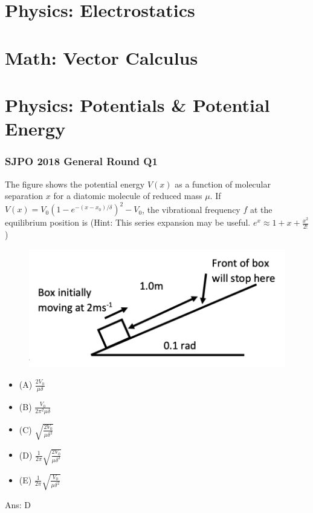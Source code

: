\documentclass{article}
\begin{document}
\section{Physics: Electrostatics}

\section{Math: Vector Calculus}
\clearpage
\section{Physics: Potentials \& Potential Energy}
\subsubsection{SJPO 2018 General Round Q1}
The figure shows the potential energy $V(x)$ as a function of molecular separation $x$ for a diatomic molecule of reduced mass $\mu$.
If $V(x)=V_0\left(1-e^{-\left(x-x_0\right)/\delta}\right)^2-V_0$, the vibrational frequency $f$ at the equilibrium position is
(Hint: This series expansion may be useful. $e^x \approx 1+x+\frac{x^2}{2 !}$ ) \\
\begin{figure}
\includegraphics[width=1.0\linewidth]{images/sjpo2016q4.png}
\end{figure}
\begin{itemize}
\item[] (A) $\frac{2 V_0}{\mu \delta}$
\item[] (B) $\frac{V_0}{2 \pi^2 \mu \delta}$
\item[] (C) $\sqrt{\frac{2 V_0}{\mu \delta^2}}$
\item[] (D) $\frac{1}{2 \pi} \sqrt{\frac{2 V_0}{\mu \delta^2}}$
\item[] (E) $\frac{1}{2 \pi} \sqrt{\frac{V_0}{\mu \delta^2}}$
\end{itemize}
Ans: \ifpaper D \fi
\clearpage
\end{document}
